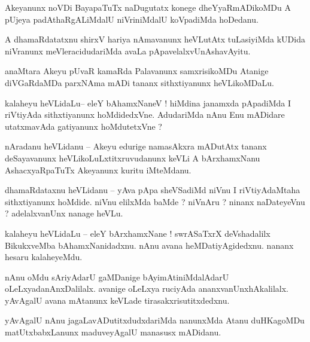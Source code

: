 \documentclass{article}
\begin{document}
\begin{mn}%
Akeyanunx noVDi BayapaTuTx naDugutatx konege dheYyaRmADikoMDu A pUjeya padAthaRgALiMdalU 
niVriniMdalU koVpadiMda hoDedanu.
\end{mn}

\begin{mn}%
A dhamaRdatatxnu shirxV hariya nAmavanunx heVLutAtx tuLasiyiMda kUDida niVranunx meVleracidudariMda 
avaLa pApavelalxvUnAshavAyitu.
\end{mn}

\begin{mn}%
anaMtara Akeyu pUvaR kamaRda Palavanunx samxrisikoMDu Atanige diVGaRdaMDa parxNAma mADi tananx 
sithxtiyanunx heVLikoMDaLu.
\end{mn}

\begin{mn}%
kalaheyu heVLidaLu-- eleY bAhamxNaneV ! hiMdina janamxda pApadiMda I riVtiyAda sithxtiyanunx 
hoMdidedxVne. AdudariMda nAnu Enu mADidare utatxmavAda gatiyanunx hoMdutetxVne ?
\end{mn}

\begin{mn}%
nAradanu heVLidanu -- Akeyu edurige namasAkxra mADutAtx tananx deSayavanunx 
heVLikoLuLxtitxruvudanunx keVLi A bArxhamxNanu AshacxyaRpaTuTx Akeyanunx kuritu iMteMdanu.
\end{mn}

\begin{mn}%
dhamaRdataxnu heVLidanu -- yAva pApa sheVSadiMd niVnu I riVtiyAdaMtaha sithxtiyanunx hoMdide. niVnu 
elilxMda baMde ? niVnAru ? ninanx naDateyeVnu ? adelalxvanUnx nanage heVLu.
\end{mn}

\begin{mn}%
kalaheyu heVLidaLu -- eleY bArxhamxNane ! swrASaTxrX deVshadalilx BikukxveMba bAhamxNanidadxnu. 
nAnu avana heMDatiyAgidedxnu. nananx hesaru kalaheyeMdu.
\end{mn}

\begin{mn}%
nAnu oMdu sAriyAdarU gaMDanige bAyimAtiniMdalAdarU oLeLxyadanAnxDalilalx. avanige oLeLxya ruciyAda 
ananxvanUnxhAkalilalx. yAvAgalU avana mAtanunx keVLade tirasakxrisutitxdedxnu.
\end{mn}

\begin{mn}%
yAvAgalU nAnu jagaLavADutitxdudxdariMda nanunxMda Atanu duHKagoMDu matUtxbabxLanunx maduveyAgalU 
manasusx mADidanu.
\end{mn}
\end{document}

